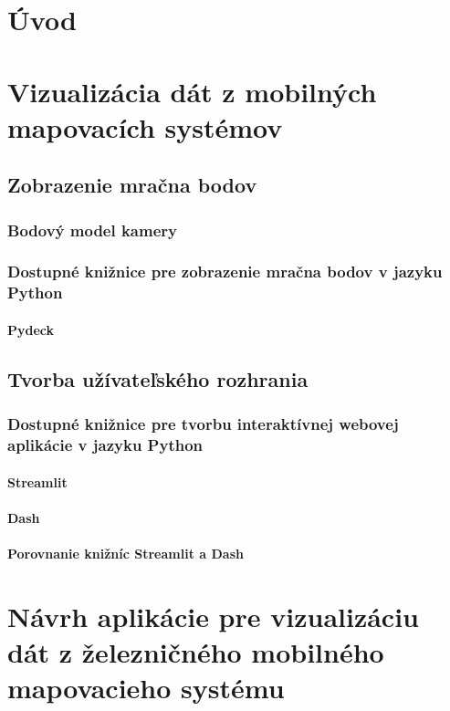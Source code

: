 %

\chapter{Úvod}

\chapter{Vizualizácia dát z mobilných mapovacích systémov}

\section{Zobrazenie mračna bodov}
\subsection{Bodový model kamery}
\subsection{Dostupné knižnice pre zobrazenie mračna bodov v jazyku Python}
\subsubsection{Pydeck}

\section{Tvorba užívateľského rozhrania}
\subsection{Dostupné knižnice pre tvorbu interaktívnej webovej aplikácie v jazyku Python}
\subsubsection{Streamlit}
\subsubsection{Dash}
\subsubsection{Porovnanie knižníc Streamlit a Dash}

\chapter{Návrh aplikácie pre vizualizáciu dát z železničného mobilného mapovacieho systému}

